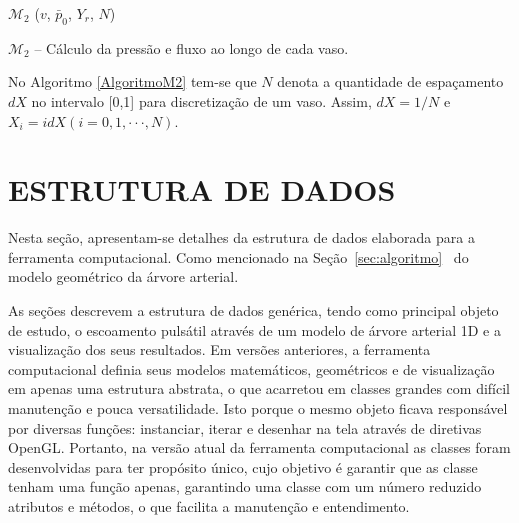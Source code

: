 \begin{algorithm}[H]
	$\mathcal{M}_2$ ($v$, $\bar{p}_0$, $Y_r$, $N$) \\
	\caption{$\mathcal{M}_2$ -- Cálculo da pressão e fluxo ao longo de cada vaso.}
	\label{AlgoritmoM2}
\end{algorithm}

No Algoritmo \ref{AlgoritmoM2} tem-se que $N$ denota a quantidade de espaçamento $dX$ no intervalo [0,1] para discretização de um vaso. Assim, $dX = 1/N$ e $X_i = i dX (i = 0, 1, \cdot\cdot\cdot, N)$.

\section{ESTRUTURA DE DADOS}\label{sec:estrutura}

Nesta seção, apresentam-se detalhes da estrutura de dados elaborada para a ferramenta computacional. Como mencionado na Seção~\ref{sec:algoritmo}~ do modelo geométrico da árvore arterial.



As seções  descrevem a estrutura de dados genérica, tendo como principal objeto de estudo, o escoamento pulsátil através de um modelo de árvore arterial 1D e a visualização dos seus resultados. Em versões anteriores, a ferramenta computacional definia seus modelos matemáticos, geométricos e de visualização em apenas uma estrutura abstrata, o que acarretou em classes grandes com difícil manutenção e pouca versatilidade. Isto porque o mesmo objeto ficava responsável por diversas funções: instanciar, iterar e desenhar na tela através de diretivas OpenGL. Portanto, na versão atual da ferramenta computacional as classes foram desenvolvidas para ter propósito único, cujo objetivo é garantir que as classe tenham uma função apenas, garantindo uma classe com um número reduzido atributos e métodos, o que facilita a manutenção e entendimento.

